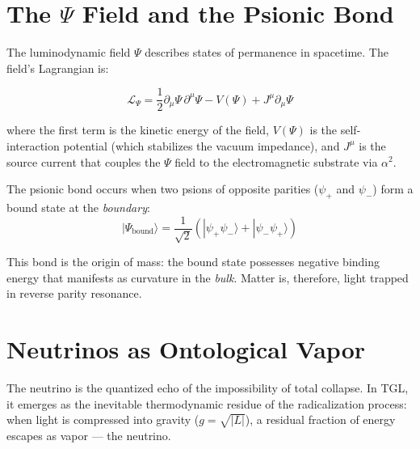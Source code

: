 \documentclass[12pt,a4paper,twoside]{article}
\newcommand{\alphaii}{\alpha^{2}}
\newcommand{\Psifield}{\Psi}
\newcommand{\psion}{\psi}
\newcommand{\boundary}{\textit{boundary}}
\newcommand{\bulk}{\textit{bulk}}
\begin{document}

\section{The $\Psifield$ Field and the Psionic Bond}


The luminodynamic field $\Psifield$ describes states of permanence in spacetime. The field's Lagrangian is:

\begin{equationbox}[title={$\Psifield$ Field Lagrangian}]
\begin{equation}
\mathcal{L}_\Psifield = \frac{1}{2}\partial_\mu \Psifield \,\partial^\mu \Psifield - V(\Psifield) + J^\mu \partial_\mu \Psifield
\label{eq:lagpsi}
\end{equation}
\end{equationbox}

\noindent where the first term is the kinetic energy of the field, $V(\Psifield)$ is the self-interaction potential (which stabilizes the vacuum impedance), and $J^\mu$ is the source current that couples the $\Psifield$ field to the electromagnetic substrate via $\alphaii$.

The psionic bond occurs when two psions of opposite parities ($\psion_+$ and $\psion_-$) form a bound state at the \boundary:
\begin{equation}
|\Psifield_{\text{bound}}\rangle = \frac{1}{\sqrt{2}}\left(|\psion_+\psion_-\rangle + |\psion_-\psion_+\rangle\right)
\label{eq:ligacao}
\end{equation}

This bond is the origin of mass: the bound state possesses negative binding energy that manifests as curvature in the \bulk. Matter is, therefore, light trapped in reverse parity resonance.


\section{Neutrinos as Ontological Vapor}


The neutrino is the quantized echo of the impossibility of total collapse. In TGL, it emerges as the inevitable thermodynamic residue of the radicalization process: when light is compressed into gravity ($g = \sqrt{|L|}$), a residual fraction of energy escapes as vapor --- the neutrino.
\end{document}

